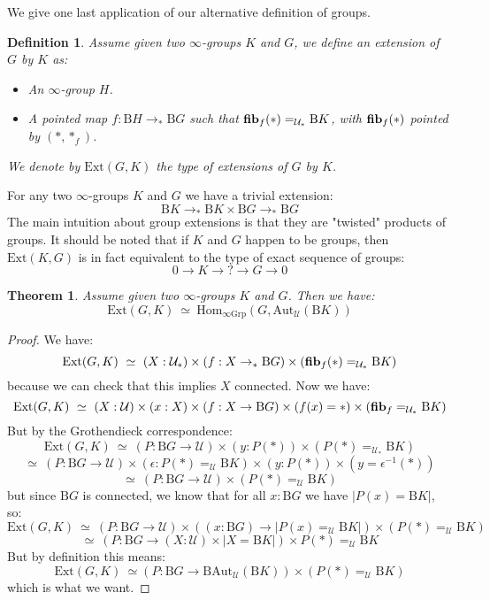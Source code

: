 \documentclass{article}
\newcommand{\U}{{\mathcal U}}
\renewcommand{\r}{\rightarrow}
\newcommand{\fib}{\mathrm{\bf fib}}
\newcommand{\Grp}{\mathrm{Grp}}
\newcommand{\Hom}{\mathrm{Hom}}
\newcommand{\B}{\mathrm{B}}
\newcommand{\Aut}{\mathrm{Aut}}
\newtheorem{definition}{Definition}
\newtheorem{theorem}{Theorem}
\begin{document}
We give one last application of our alternative definition of groups. %

\begin{definition}
Assume given two $\infty$-groups $K$ and $G$, we define an extension of $G$ by $K$ as:
\begin{itemize}
\item An $\infty$-group $H$.
\item A pointed map $f : \B H \r_* \B G$ such that $\fib_f(*) =_{\U_*} \B K$, with $\fib_f(*)$ pointed by $(*,*_f)$.
\end{itemize}
We denote by $\mathrm{Ext}(G,K)$ the type of extensions of $G$ by $K$.
\end{definition}

For any two $\infty$-groups $K$ and $G$ we have a trivial extension:
\[\B K\r_* \B K\times\B G\r_*\B G\]
The main intuition about group extensions is that they are "twisted" products of groups. %
It should be noted that if $K$ and $G$ happen to be groups, then $\mathrm{Ext}(K,G)$ is in fact equivalent to the type of exact sequence of groups:
\[0\r K\r ?\r G\r 0\]


\begin{theorem}
Assume given two $\infty$-groups $K$ and $G$. Then we have:
\[\mathrm{Ext}(G,K)\ \simeq \ \Hom_{\infty\Grp}(G,\Aut_\U(\B K))\]
\end{theorem}
\begin{proof}
We have:
\[\mathrm{Ext}(G,K) \ \simeq\ (X:\U_*) \times (f:X\r_* \B G) \times (\fib_f(*)=_{\U_*} \B K) \]
because we can check that this implies $X$ connected. Now we have:
\[\mathrm{Ext}(G,K) \ \simeq \ (X:\U)\times (x:X)\times (f:X\r \B G)\times (f(x)=*) \times  (\fib_f=_{\U_*} \B K) \]
But by the Grothendieck correspondence:
\[\mathrm{Ext}(G,K) \ \simeq\ (P : \B G \r \U) \times (y:P(*))\times (P(*) =_{\U_*} \B K) \]
\[\simeq \ (P : \B G \r \U)\times (\epsilon : P(*) =_\U \B K) \times (y:P(*)) \times (y= \epsilon^{-1}(*))\]
\[\simeq\ (P:\B G \r \U) \times (P(*) =_\U \B K)\]
but since $\B G$ is connected, we know that for all $x:\B G$ we have $|P(x) = \B K|$, so:
\[\mathrm{Ext}(G,K) \ \simeq\ (P:\B G \r \U)\times ((x:\B G)\r |P(x) =_\U \B K|) \times (P(*) =_\U \B K)\]
\[\simeq\  (P:\B G\r (X:\U)\times | X= \B K|)\times P(*) =_\U \B K\]
But by definition this means:
\[\mathrm{Ext}(G,K) \ \simeq (P:\B G\r \B\Aut_\U(\B K))\times (P(*) =_\U \B K)\]
which is what we want.
\end{proof}
\end{document}
